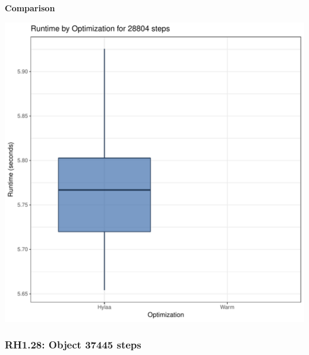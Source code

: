 \documentclass{article}\usepackage[]{graphicx}\usepackage[]{color}
\makeatletter
\def\maxwidth{ %
  \ifdim\Gin@nat@width>\linewidth
    \linewidth
  \else
    \Gin@nat@width
  \fi
}
\newenvironment{knitrout}{}{} %
\makeatother
\begin{document}
 \textbf{Comparison}
  
\begin{knitrout}
\color{fgcolor}
\includegraphics[width=\maxwidth]{figure/RH1_steps28804-1} 

\end{knitrout}


\subsubsection{RH1.28: Object 37445 steps}
\end{document}
